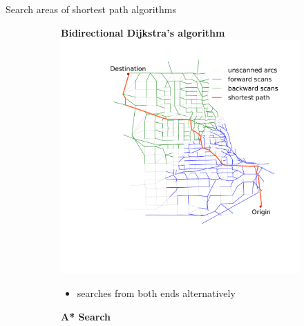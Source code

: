 \documentclass[final]{beamer}
\begin{document}
\begin{frame}{ }
\begin{columns}[t]
\begin{column}{.4\linewidth}
\begin{block}{Search areas of shortest path algorithms}
\begin{figure}
\begin{subfigure}{.5\linewidth}
\begin{itemize}
                        \end{itemize}
                    \end{subfigure}%
                    \begin{subfigure}{.5\linewidth}
                        \vspace{.1em}
                        \centering
                        {\bfseries Bidirectional Dijkstra's algorithm}
                        \includegraphics[width=\linewidth,trim=120px 280px 48px 60px,clip]{img/dijkstra_bidirect}
                        \begin{itemize}
                        \centering
                            \item searches from \alert{both ends alternatively}
                        \end{itemize}
                    \end{subfigure}
                    \begin{subfigure}{.5\linewidth}
                        \centering
                        {\bfseries A* Search}

\end{subfigure}
\end{figure}
\end{block}
\end{column}
\end{columns}
\end{frame}
\end{document}

